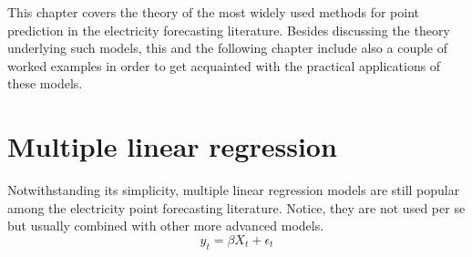 This chapter covers the theory of the most widely used methods for point prediction in the electricity forecasting literature. Besides discussing the theory underlying such models, this and the following chapter include also a couple of worked examples in order to get acquainted with the practical applications of these models.




\section{Multiple linear regression}
Notwithstanding its simplicity, multiple linear regression models are still popular among the electricity point forecasting literature. Notice, they are not used per se but usually combined with other more advanced models.
\begin{equation}
    y_t=\beta X_t + \epsilon_t
\end{equation}

